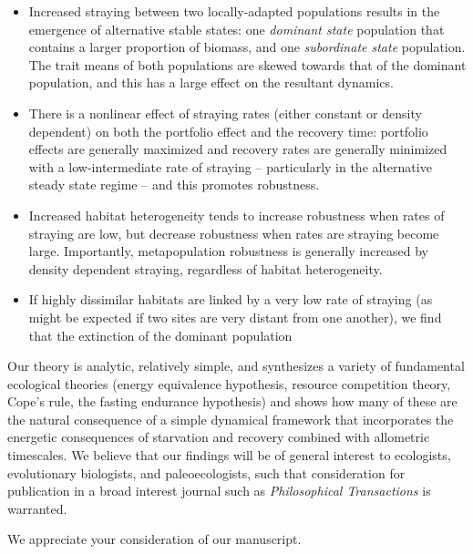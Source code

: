 \documentclass[ucm,12pt]{ucletter}
\begin{document}
\begin{letter}
\begin{itemize}
  \item Increased straying between two locally-adapted populations results in the emergence of alternative stable states: one \emph{dominant state} population that contains a larger proportion of biomass, and one \emph{subordinate state} population.
  The trait means of both populations are skewed towards that of the dominant population, and this has a large effect on the resultant dynamics.
  \item There is a nonlinear effect of straying rates (either constant or density dependent) on both the portfolio effect and the recovery time: portfolio effects are generally maximized and recovery rates are generally minimized with a low-intermediate rate of straying -- particularly in the alternative steady state regime -- and this promotes robustness.
  \item Increased habitat heterogeneity tends to increase robustness when rates of straying are low, but decrease robustness when rates are straying become large. Importantly, metapopulation robustness is generally increased by density dependent straying, regardless of habitat heterogeneity.
  \item If highly dissimilar habitats are linked by a very low rate of straying (as might be expected if two sites are very distant from one another), we find that the extinction of the dominant population 
\end{itemize}


Our theory is analytic, relatively simple, and synthesizes a variety of fundamental ecological theories (energy equivalence hypothesis, resource competition theory, Cope’s rule, the fasting endurance hypothesis) and shows how many of these are the natural consequence of a simple dynamical framework that incorporates the energetic consequences of starvation and recovery combined with allometric timescales. 
We believe that our findings will be of general interest to ecologists, evolutionary biologists, and paleoecologists, such that consideration for publication in a broad interest journal such as \emph{Philosophical Transactions} is warranted.

We appreciate your consideration of our manuscript.



\end{letter}
\end{document}
